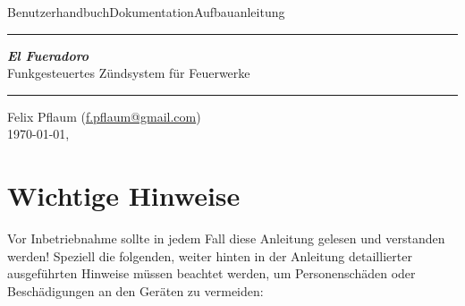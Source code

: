 \documentclass[paper=a4, parskip, numbers=noenddot, toc=listof, headsepline]{scrbook}
\newcommand{\anlage}{\emph{El Fueradoro}}
\begin{document}
	\begin{titlepage}
		\thispagestyle{empty}
		{\sffamily\LARGE Benutzerhandbuch{\hfill}Dokumentation{\hfill}Aufbauanleitung}\\ \hrule \vspace*{\fill}
		\begin{center}{\fontsize{90pt}{90pt} \sffamily\textbf{\anlage}} \\ \vspace{2em}
			{\LARGE \sffamily Funkgesteuertes Zündsystem für Feuerwerke}
		\end{center}
		\vspace*{\fill}
		\hrule
		\begin{center}
			\sffamily\Large Felix Pflaum (\href{mailto:f.pflaum@gmail.com}{f.pflaum@gmail.com})\\
			\normalsize \ddmmyyyydate\today, \currenttime
		\end{center}
	\end{titlepage}
	\chapter*{Wichtige Hinweise}

	 Vor Inbetriebnahme sollte in jedem Fall diese Anleitung gelesen und verstanden werden! Speziell die folgenden, weiter hinten in der Anleitung detaillierter ausgeführten Hinweise müssen beachtet werden, um Personenschäden oder Beschädigungen an den Geräten zu vermeiden:
\end{document}
